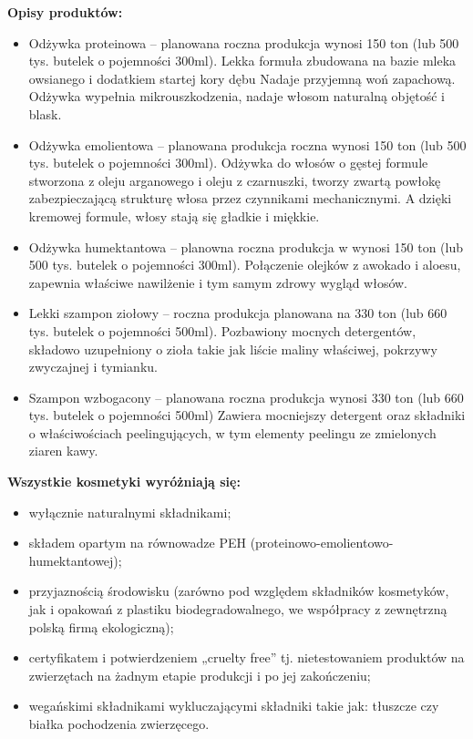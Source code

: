 \textbf{Opisy produktów:}
\begin{itemize}
	\item Odżywka proteinowa -- planowana roczna produkcja wynosi 150 ton (lub 500 tys. butelek o pojemności 300ml). Lekka formuła zbudowana na bazie mleka owsianego i dodatkiem startej kory dębu Nadaje przyjemną woń zapachową. Odżywka wypełnia mikrouszkodzenia, nadaje włosom naturalną objętość i blask.
	\item Odżywka emolientowa -- planowana produkcja roczna wynosi 150 ton (lub 500 tys. butelek o pojemności 300ml). Odżywka do włosów o gęstej formule stworzona z oleju arganowego i oleju z czarnuszki, tworzy zwartą powłokę zabezpieczającą strukturę włosa przez czynnikami mechanicznymi. A dzięki kremowej formule, włosy stają się gładkie i miękkie.
	\item Odżywka humektantowa -- planowna roczna produkcja w wynosi 150 ton (lub 500 tys. butelek o pojemności 300ml). Połączenie olejków z awokado i aloesu, zapewnia właściwe nawilżenie i tym samym zdrowy wygląd włosów.
	\item Lekki szampon ziołowy -- roczna produkcja planowana na 330 ton (lub 660 tys. butelek o pojemności 500ml). Pozbawiony mocnych detergentów, składowo uzupełniony o zioła takie jak liście maliny właściwej, pokrzywy zwyczajnej i tymianku.
	\item Szampon wzbogacony -- planowana roczna produkcja wynosi 330 ton (lub 660 tys. butelek o pojemności 500ml) Zawiera mocniejszy detergent oraz składniki o właściwościach peelingujących, w tym elementy peelingu ze zmielonych ziaren kawy.
\end{itemize}\vspace{\baselineskip}

\textbf{Wszystkie kosmetyki wyróżniają się:}
\begin{itemize}
\item wyłącznie naturalnymi składnikami;
\item składem opartym na równowadze PEH (proteinowo-emolientowo-humektantowej);
\item przyjaznością środowisku (zarówno pod względem składników kosmetyków, jak i opakowań z plastiku biodegradowalnego, we współpracy z zewnętrzną polską firmą ekologiczną);
\item certyfikatem i potwierdzeniem „cruelty free” tj. nietestowaniem produktów na zwierzętach na żadnym etapie produkcji i po jej zakończeniu;
\item wegańskimi składnikami wykluczającymi składniki takie jak: tłuszcze czy białka pochodzenia zwierzęcego.
\end{itemize}\vspace{\baselineskip}

